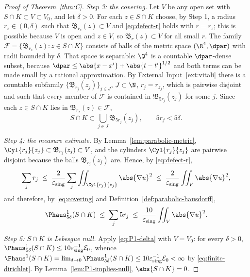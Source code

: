 \documentclass[11pt,reqno]{amsart}
\begin{document}
\begin{proof}[Proof of Theorem~\ref{thm:C}]
\emph{Step 3: the covering.} Let $V$ be any open set with
$S\cap K\subset V\subset V_{0}$, and let $\delta>0$. For each $z\in S\cap K$
choose, by Step 1, a radius $r_{z}\in(0,\delta)$ such that
$\mathfrak{B}_{r_{z}}(z)\subset V$ and \eqref{eq:defect-r} holds with $r=r_{z}$;
this is possible because $V$ is open and $z\in V$, so
$\mathfrak{B}_{r}(z)\subset V$ for all small $r$. The family
$\mathcal{F}=\{\mathfrak{B}_{r_{z}}(z):z\in S\cap K\}$ consists of balls of the
metric space $(\R^{4},\dpar)$ with radii bounded by $\delta$. That space is
separable: $\Q^{4}$ is a countable $\dpar$-dense subset, because
$\dpar\le\abs{x-x'}+\abs{t-t'}^{1/2}$ and both terms can be made small by a
rational approximation. By
External Input~\ref{ext:vitali} there is a countable subfamily
$\{\mathfrak{B}_{r_{j}}(z_{j})\}_{j\in J}$, $J\subset\N$, $r_{j}=r_{z_{j}}$, which is pairwise
disjoint and such that every member of $\mathcal{F}$ is contained in
$\mathfrak{B}_{5r_{j}}(z_{j})$ for some $j$. Since each $z\in S\cap K$ lies in
$\mathfrak{B}_{r_{z}}(z)\in\mathcal{F}$,
\begin{equation}\label{eq:covering}
  S\cap K\subset\bigcup_{j\in J}\mathfrak{B}_{5r_{j}}(z_{j}),
  \qquad 5r_{j}<5\delta .
\end{equation}

\emph{Step 4: the measure estimate.} By Lemma~\ref{lem:parabolic-metric},
$\Cyl{r_{j}}{z_{j}}\subset\mathfrak{B}_{r_{j}}(z_{j})\subset V$, and the
cylinders $\Cyl{r_{j}}{z_{j}}$ are pairwise disjoint because the balls
$\mathfrak{B}_{r_{j}}(z_{j})$ are. Hence, by \eqref{eq:defect-r},
\begin{equation}\label{eq:sum-radii}
  \sum_{j}r_{j}
  \;\le\;\frac{2}{\varepsilon_{\mathrm{sing}}}\sum_{j}\iint_{\Cyl{r_{j}}{z_{j}}}\abs{\nabla u}^{2}
  \;\le\;\frac{2}{\varepsilon_{\mathrm{sing}}}\iint_{V}\abs{\nabla u}^{2} ,
\end{equation}
and therefore, by \eqref{eq:covering} and Definition~\ref{def:parabolic-hausdorff},
\begin{equation}\label{eq:P1-delta}
  \Phaus^{1}_{5\delta}(S\cap K)\;\le\;\sum_{j}5r_{j}
  \;\le\;\frac{10}{\varepsilon_{\mathrm{sing}}}\iint_{V}\abs{\nabla u}^{2} .
\end{equation}

\emph{Step 5: $S\cap K$ is Lebesgue null.} Apply \eqref{eq:P1-delta} with
$V=V_{0}$: for every $\delta>0$,
$\Phaus^{1}_{5\delta}(S\cap K)\le10\varepsilon_{\mathrm{sing}}^{-1}\mathcal{E}_{0}$, whence
$\Phaus^{1}(S\cap K)=\lim_{\delta\to0}\Phaus^{1}_{5\delta}(S\cap K)
 \le10\varepsilon_{\mathrm{sing}}^{-1}\mathcal{E}_{0}<\infty$ by
\eqref{eq:finite-dirichlet}. By Lemma~\ref{lem:P1-implies-null},
$\abs{S\cap K}=0$.


\end{proof}
\end{document}
